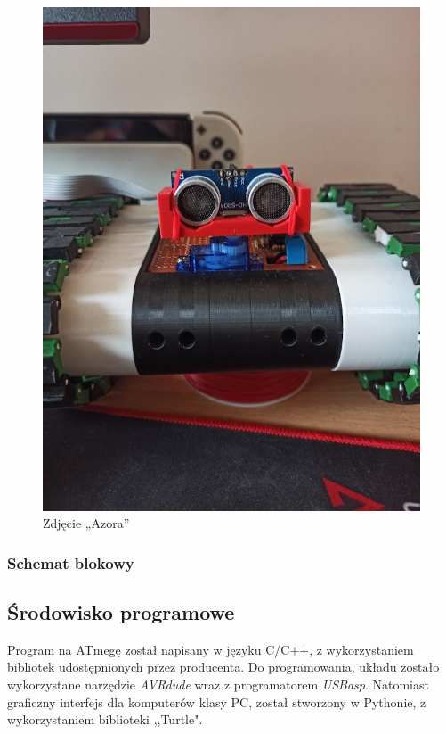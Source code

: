     \begin{figure}[!ht]
        \centering
        \includegraphics[height = 0.4\textheight]{Img/Azor.jpg}
        \caption{Zdjęcie „Azora”}
    \end{figure}

    \newpage
        \subsubsection{Schemat blokowy}
            
        
    \subsection{Środowisko programowe}
        \tab Program na ATmegę został napisany w języku C/C++, z wykorzystaniem bibliotek udostępnionych przez producenta.
        Do programowania, układu zostało wykorzystane narzędzie \textit{AVRdude} wraz z programatorem \textit{USBasp}.
        Natomiast graficzny interfejs dla komputerów klasy PC, został stworzony w Pythonie, z wykorzystaniem biblioteki ,,Turtle".
